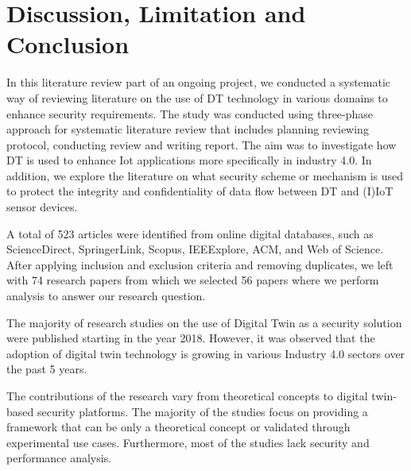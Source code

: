 \chapter{Discussion, Limitation and Conclusion}
\label{Chapter4} %

In this literature review part of an ongoing project, we conducted a systematic way of reviewing literature on the use of DT technology in various domains to enhance security requirements. The study was conducted using three-phase approach for systematic literature review that includes planning reviewing protocol, conducting review and writing report. The aim was to investigate how DT is used to enhance Iot applications more specifically in industry 4.0. In addition, we explore the literature on what security scheme or mechanism is used to protect the integrity and confidentiality of data flow between DT and (I)IoT sensor devices.



A total of 523 articles were identified from online digital databases, such as ScienceDirect, SpringerLink, Scopus, IEEExplore, ACM, and Web of Science. After applying inclusion and exclusion criteria and removing duplicates, we left with 74 research papers from which we selected 56 papers where we perform analysis to answer our research question.

The majority of research studies on the use of Digital Twin as a security solution were published starting in the year 2018. However, it was observed that the adoption of digital twin technology is growing in various Industry 4.0 sectors over the past 5 years. 

The contributions of the research vary from theoretical concepts to digital twin-based security platforms. The majority of the studies focus on providing a framework that can be only a theoretical concept or validated through experimental use cases. Furthermore, most of the studies lack security and performance analysis.

